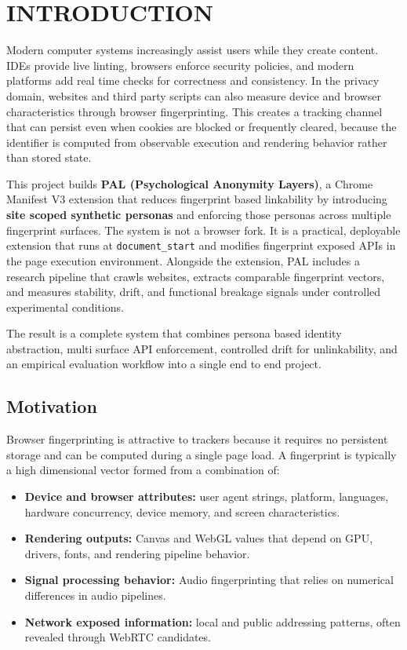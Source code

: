 \documentclass[11pt]{report}
\begin{document}
\newpage

\tableofcontents
\listoffigures
\listoftables


\chapter{INTRODUCTION}

Modern computer systems increasingly assist users while they create content. IDEs provide live linting, browsers enforce security policies, and modern platforms add real time checks for correctness and consistency. In the privacy domain, websites and third party scripts can also measure device and browser characteristics through browser fingerprinting. This creates a tracking channel that can persist even when cookies are blocked or frequently cleared, because the identifier is computed from observable execution and rendering behavior rather than stored state.

This project builds \textbf{PAL (Psychological Anonymity Layers)}, a Chrome Manifest V3 extension that reduces fingerprint based linkability by introducing \textbf{site scoped synthetic personas} and enforcing those personas across multiple fingerprint surfaces. The system is not a browser fork. It is a practical, deployable extension that runs at \texttt{document\_start} and modifies fingerprint exposed APIs in the page execution environment. Alongside the extension, PAL includes a research pipeline that crawls websites, extracts comparable fingerprint vectors, and measures stability, drift, and functional breakage signals under controlled experimental conditions.

The result is a complete system that combines persona based identity abstraction, multi surface API enforcement, controlled drift for unlinkability, and an empirical evaluation workflow into a single end to end project.

\section{Motivation}

Browser fingerprinting is attractive to trackers because it requires no persistent storage and can be computed during a single page load. A fingerprint is typically a high dimensional vector formed from a combination of:

\begin{itemize}
    \item \textbf{Device and browser attributes:} user agent strings, platform, languages, hardware concurrency, device memory, and screen characteristics.
    \item \textbf{Rendering outputs:} Canvas and WebGL values that depend on GPU, drivers, fonts, and rendering pipeline behavior.
    \item \textbf{Signal processing behavior:} Audio fingerprinting that relies on numerical differences in audio pipelines.
    \item \textbf{Network exposed information:} local and public addressing patterns, often revealed through WebRTC candidates.
\end{itemize}
\end{document}
